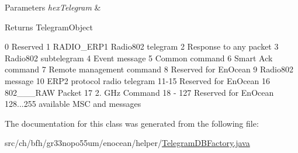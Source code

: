 \begin{DoxyParams}{Parameters}
{\em hex\+Telegram} & \\
\hline
\end{DoxyParams}
\begin{DoxyReturn}{Returns}
Telegram\+Object 
\end{DoxyReturn}
0 Reserved 1 R\+A\+D\+I\+O\+\_\+\+E\+R\+P1 Radio802 telegram 2 Response to any packet 3 Radio802 subtelegram 4 Event message 5 Common command 6 Smart Ack command 7 Remote management command 8 Reserved for En\+Ocean 9 Radio802 message 10 E\+R\+P2 protocol radio telegram 11-\/15 Reserved for En\+Ocean 16 802\+\_\+\_\+\_\+\+R\+AW Packet 17 2. G\+Hz Command 18 -\/ 127 Reserved for En\+Ocean 128...255 available M\+SC and messages

The documentation for this class was generated from the following file\+:\begin{DoxyCompactItemize}
\item 
src/ch/bfh/gr33nopo55um/enocean/helper/\hyperlink{_telegram_d_b_factory_8java}{Telegram\+D\+B\+Factory.\+java}\end{DoxyCompactItemize}

